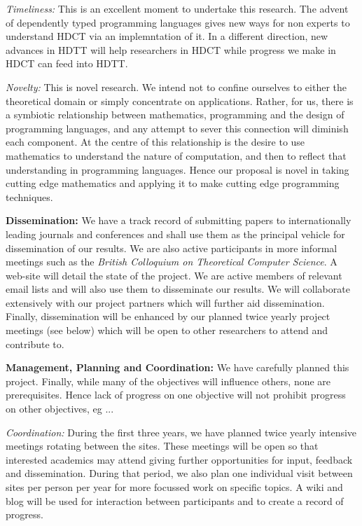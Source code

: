 \documentclass[a4paper,10pt]{article}
\begin{document}
{\em Timeliness:} This is an excellent moment to undertake this
research. The advent of dependently typed programming languages gives
new ways for non experts to understand HDCT via an implemntation of
it. In a different direction, new advances in HDTT will help
researchers in HDCT while progress we make in HDCT can feed into HDTT. 

{\em Novelty:} This is novel research. We intend not to confine
ourselves to either the theoretical domain or simply concentrate on
applications. Rather, for us, there is a symbiotic relationship
between mathematics, programming and the design of programming
languages, and any attempt to sever this connection will diminish each
component. At the centre of this relationship is the desire to use
mathematics to understand the nature of computation, and then to
reflect that understanding in programming languages. Hence our
proposal is novel in taking cutting edge mathematics and applying it
to make cutting edge programming techniques.

{\bf Dissemination:} We have a track record of submitting papers to
internationally leading journals and conferences and shall use them as
the principal vehicle for dissemination of our results. We are also
active participants in more informal meetings such as the {\em British
  Colloquium on Theoretical Computer Science}. A web-site will detail
the state of the project. We are active members of relevant email
lists and will also use them to disseminate our results. We will
collaborate extensively with our project partners which will further
aid dissemination. Finally, dissemination will be enhanced by our
planned twice yearly project meetings (see below) which will be open
to other researchers to attend and contribute to.

{\bf Management, Planning and Coordination:} We have carefully planned
this project. Finally, while many of the
objectives will influence others, none are prerequisites. Hence lack of
progress on one objective will not prohibit progress on other
objectives, eg ... 

{\em Coordination:} During the first three years, we have planned
twice yearly intensive meetings rotating between the sites. These
meetings will be open so that interested academics may attend giving
further opportunities for input, feedback and dissemination. During
that period, we also plan one individual visit between sites per
person per year for more focussed work on specific topics.  A wiki and
blog will be used for interaction between participants and to create a
record of progress. 
\end{document}
